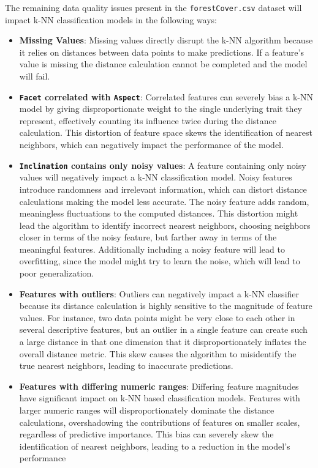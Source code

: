 \documentclass[conference]{IEEEtran}
\begin{document}
The remaining data quality issues present in the \texttt{forestCover.csv} dataset will impact k-NN classification models in the following ways:

\begin{itemize}
    \item \textbf{Missing Values}: Missing values directly disrupt the k-NN algorithm because it relies on distances between data points to make predictions. If a feature's value is missing the distance calculation cannot be completed and the model will fail.
    \item \textbf{\texttt{Facet} correlated with \texttt{Aspect}}: Correlated features can severely bias a k-NN model by giving disproportionate weight to the single underlying trait they represent, effectively counting its influence twice during the distance calculation. This distortion of feature space skews the identification of nearest neighbors, which can negatively impact the performance of the model.
    \item \textbf{\texttt{Inclination} contains only noisy values}: A feature containing only noisy values will negatively impact a k-NN classification model. Noisy features introduce randomness and irrelevant information, which can distort distance calculations making the model less accurate. The noisy feature adds random, meaningless fluctuations to the computed distances. This distortion might lead the algorithm to identify incorrect nearest neighbors, choosing neighbors closer in terms of the noisy feature, but farther away in terms of the meaningful features. Additionally including a noisy feature will lead to overfitting, since the model might try to learn the noise, which will lead to poor generalization.
    \item \textbf{Features with outliers}: Outliers can negatively impact a k-NN classifier because its distance calculation is highly sensitive to the magnitude of feature values. For instance, two data points might be very close to each other in several descriptive features, but an outlier in a single feature can create such a large distance in that one dimension that it disproportionately inflates the overall distance metric. This skew causes the algorithm to misidentify the true nearest neighbors, leading to inaccurate predictions.
    \item \textbf{Features with differing numeric ranges}: Differing feature magnitudes have significant impact on k-NN based classification models. Features with larger numeric ranges will disproportionately dominate the distance calculations, overshadowing the contributions of features on smaller scales, regardless of predictive importance. This bias can severely skew the identification of nearest neighbors, leading to a reduction in the model's performance

\end{itemize}
\end{document}
